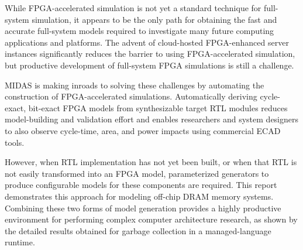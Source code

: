 While FPGA-accelerated simulation is not yet a standard technique for
full-system simulation, it appears to be the only path for obtaining the fast
and accurate full-system models required to investigate many future computing
applications and platforms. The advent of cloud-hosted FPGA-enhanced server
instances significantly reduces the barrier to using FPGA-accelerated
simulation, but productive development of full-system FPGA simulations is still
a challenge.

MIDAS is making inroads to solving these challenges by automating the
construction of FPGA-accelerated simulations. Automatically deriving
cycle-exact, bit-exact FPGA models from synthesizable target RTL modules
reduces model-building and validation effort and enables researchers and system
designers to also observe cycle-time, area, and power impacts using commercial
ECAD tools.

However, when RTL implementation has not yet been built, or when that RTL is
not easily transformed into an FPGA model, parameterized generators to produce
configurable models for these components are required. This report demonstrates
this approach for modeling off-chip DRAM memory systems. Combining these two forms
of model generation provides a highly productive environment for performing
complex computer architecture research, as shown by the detailed results
obtained for garbage collection in a managed-language runtime.
